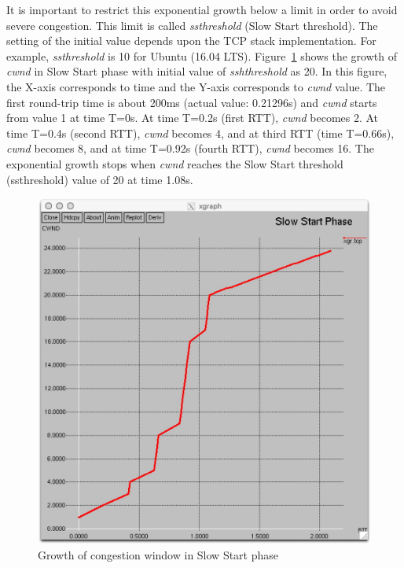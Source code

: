 \begin{multicols}{2}
It is important to restrict this exponential growth below a limit in order to avoid severe congestion. This limit is called \textit{ssthreshold} (Slow Start threshold). The setting of the initial value depends upon the TCP stack implementation. For example, \textit{ssthreshold} is 10 for Ubuntu (16.04 LTS). Figure~\ref{chap2-fig03} shows the growth of \textit{cwnd} in Slow Start phase with initial value of \textit{sshthreshold} as 20. In this figure, the X-axis corresponds to time and the Y-axis corresponds to \textit{cwnd} value. The first round-trip time is about 200ms (actual value: 0.21296s) and \textit{cwnd} starts from value 1 at time T=0s. At time T=0.2s (first RTT), \textit{cwnd} becomes 2. At time T=0.4s (second RTT), \textit{cwnd} becomes 4, and at third RTT (time T=0.66s), \textit{cwnd} becomes 8, and at time T=0.92s (fourth RTT), \textit{cwnd} becomes 16. The exponential growth stops when \textit{cwnd} reaches the Slow Start threshold (ssthreshold) value of 20 at time 1.08s. 
\begin{figure}[H]
\centering
\includegraphics[scale=.82]{src/Figures/chap2/chap2-fig03.jpg}
\caption{Growth of congestion window in Slow Start phase}\label{chap2-fig03}
\end{figure}


\end{multicols}
